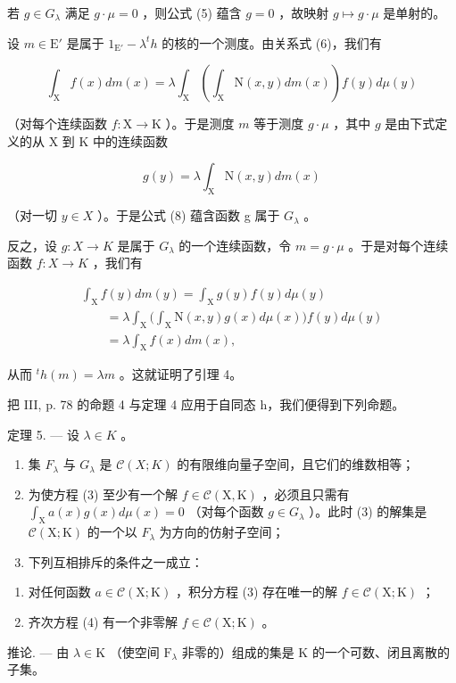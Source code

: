 若 \(g \in G_{\lambda}\) 满足 \(g \cdot \mu = 0\) ，则公式 (5) 蕴含 \(g = 0\) ，故映射 \(g \mapsto g \cdot \mu\) 是单射的。

设 \(m \in \mathrm{E}'\) 是属于 \(1_{\mathrm{E}'} - \lambda^t h\) 的核的一个测度。由关系式 (6)，我们有

\[
\int_ {\mathrm{X}} f (x) d m (x) = \lambda \int_ {\mathrm{X}} \left(\int_ {\mathrm{X}} \mathrm{N} (x, y) d m (x)\right) f (y) d \mu (y)\tag{7}
\]

（对每个连续函数 \(f: \mathrm{X} \to \mathrm{K}\) ）。于是测度 \(m\) 等于测度 \(g \cdot \mu\) ，其中 \(g\) 是由下式定义的从 \(\mathrm{X}\) 到 \(\mathrm{K}\) 中的连续函数

\[
g (y) = \lambda \int_ {\mathrm{X}} \mathrm{N} (x, y) d m (x)\tag{8}
\]

（对一切 \(y \in X\) ）。于是公式 (8) 蕴含函数 g 属于 \(G_{\lambda}\) 。

反之，设 \(g: X \to K\) 是属于 \(G_{\lambda}\) 的一个连续函数，令 \(m = g \cdot \mu\) 。于是对每个连续函数 \(f: X \to K\) ，我们有

\[
\begin{array}{l} \int_ {\mathrm{X}} f (y) d m (y) = \int_ {\mathrm{X}} g (y) f (y) d \mu (y) \\ \qquad = \lambda \int_ {\mathrm{X}} \Big (\int_ {\mathrm{X}} \mathrm{N} (x, y) g (x) d \mu (x) \Big) f (y) d \mu (y) \\ \qquad = \lambda \int_ {\mathrm{X}} f (x) d m (x), \end{array}
\]

从而 \({}^{t}h(m)=\lambda m\) 。这就证明了引理 4。

把 III, p. 78 的命题 4 与定理 4 应用于自同态 h，我们便得到下列命题。

定理 5. --- 设 \(\lambda\in K\) 。

\begin{enumerate}
\def\labelenumi{\alph{enumi})}
\item
  集 \(F_{\lambda}\) 与 \(G_{\lambda}\) 是 \(\mathcal{C}(X;K)\) 的有限维向量子空间，且它们的维数相等；
\item
  为使方程 (3) 至少有一个解 \(f \in \mathcal{C}(\mathrm{X}, \mathrm{K})\) ，必须且只需有 \(\int_{\mathrm{X}} a(x) g(x) d\mu(x) = 0\) （对每个函数 \(g \in G_{\lambda}\) ）。此时 (3) 的解集是 \(\mathcal{C}(\mathrm{X}; \mathrm{K})\) 的一个以 \(F_{\lambda}\) 为方向的仿射子空间；
\item
  下列互相排斥的条件之一成立：
\end{enumerate}

\begin{enumerate}
\def\labelenumi{(\roman{enumi})}
\item
  对任何函数 \(a \in \mathcal{C}(\mathrm{X};\mathrm{K})\) ，积分方程 (3) 存在唯一的解 \(f \in \mathcal{C}(\mathrm{X};\mathrm{K})\) ；
\item
  齐次方程 (4) 有一个非零解 \(f \in \mathcal{C}(\mathrm{X};\mathrm{K})\) 。
\end{enumerate}

推论. --- 由 \(\lambda\in\mathrm{K}\) （使空间 \(\mathrm{F}_{\lambda}\) 非零的）组成的集是 K 的一个可数、闭且离散的子集。


